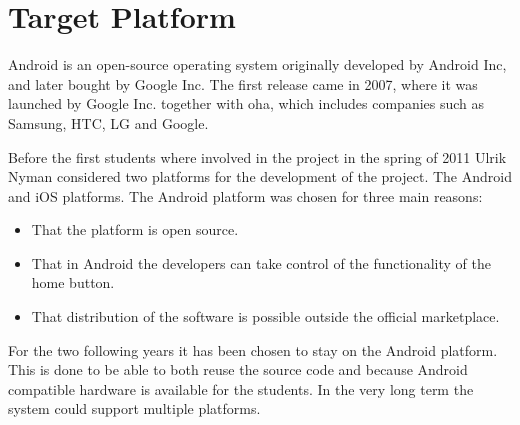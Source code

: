 \section{Target Platform}
\label{sec:platform}
Android is an open-source operating system originally developed by Android Inc, and later bought by Google Inc. The first release came in 2007, where it was launched by Google Inc. together with \ac{oha}, which includes companies such as Samsung, HTC, LG and Google.

Before the first students where involved in the project in the spring of 2011 Ulrik Nyman considered two platforms for the development of the project. The Android and iOS platforms. The Android platform was chosen for three main reasons:
\begin{itemize}
\item That the platform is open source.
\item That in Android the developers can take control of the functionality of the home button.
\item That distribution of the software is possible outside the official marketplace.
\end{itemize}

For the two following years it has been chosen to stay on the Android platform. This is done to be able to both reuse the source code and because Android compatible hardware is available for the students.
In the very long term the system could support multiple platforms.




